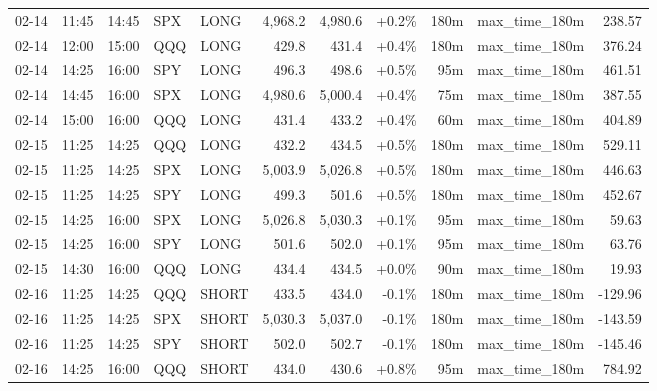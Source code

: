\documentclass[11pt,a4paper,twoside]{article}
\begin{document}
\begin{center}
\begin{longtable}{>{\color{txtmain}}l l l l l r r r r >{\color{txtmain}}l r}
02-14 & 11:45 & 14:45 & SPX & LONG & 4,968.2 & 4,980.6 & \textcolor{wingreen}{+0.2\%} & 180m & max\_time\_180m & \textcolor{wingreen}{238.57} \\
02-14 & 12:00 & 15:00 & QQQ & LONG & 429.8 & 431.4 & \textcolor{wingreen}{+0.4\%} & 180m & max\_time\_180m & \textcolor{wingreen}{376.24} \\
02-14 & 14:25 & 16:00 & SPY & LONG & 496.3 & 498.6 & \textcolor{wingreen}{+0.5\%} & 95m & max\_time\_180m & \textcolor{wingreen}{461.51} \\
02-14 & 14:45 & 16:00 & SPX & LONG & 4,980.6 & 5,000.4 & \textcolor{wingreen}{+0.4\%} & 75m & max\_time\_180m & \textcolor{wingreen}{387.55} \\
02-14 & 15:00 & 16:00 & QQQ & LONG & 431.4 & 433.2 & \textcolor{wingreen}{+0.4\%} & 60m & max\_time\_180m & \textcolor{wingreen}{404.89} \\
02-15 & 11:25 & 14:25 & QQQ & LONG & 432.2 & 434.5 & \textcolor{wingreen}{+0.5\%} & 180m & max\_time\_180m & \textcolor{wingreen}{529.11} \\
02-15 & 11:25 & 14:25 & SPX & LONG & 5,003.9 & 5,026.8 & \textcolor{wingreen}{+0.5\%} & 180m & max\_time\_180m & \textcolor{wingreen}{446.63} \\
02-15 & 11:25 & 14:25 & SPY & LONG & 499.3 & 501.6 & \textcolor{wingreen}{+0.5\%} & 180m & max\_time\_180m & \textcolor{wingreen}{452.67} \\
02-15 & 14:25 & 16:00 & SPX & LONG & 5,026.8 & 5,030.3 & \textcolor{wingreen}{+0.1\%} & 95m & max\_time\_180m & \textcolor{wingreen}{59.63} \\
02-15 & 14:25 & 16:00 & SPY & LONG & 501.6 & 502.0 & \textcolor{wingreen}{+0.1\%} & 95m & max\_time\_180m & \textcolor{wingreen}{63.76} \\
02-15 & 14:30 & 16:00 & QQQ & LONG & 434.4 & 434.5 & \textcolor{wingreen}{+0.0\%} & 90m & max\_time\_180m & \textcolor{wingreen}{19.93} \\
02-16 & 11:25 & 14:25 & QQQ & SHORT & 433.5 & 434.0 & \textcolor{lossred}{-0.1\%} & 180m & max\_time\_180m & \textcolor{lossred}{-129.96} \\
02-16 & 11:25 & 14:25 & SPX & SHORT & 5,030.3 & 5,037.0 & \textcolor{lossred}{-0.1\%} & 180m & max\_time\_180m & \textcolor{lossred}{-143.59} \\
02-16 & 11:25 & 14:25 & SPY & SHORT & 502.0 & 502.7 & \textcolor{lossred}{-0.1\%} & 180m & max\_time\_180m & \textcolor{lossred}{-145.46} \\
02-16 & 14:25 & 16:00 & QQQ & SHORT & 434.0 & 430.6 & \textcolor{wingreen}{+0.8\%} & 95m & max\_time\_180m & \textcolor{wingreen}{784.92} \\

\end{longtable}
\end{center}
\end{document}
